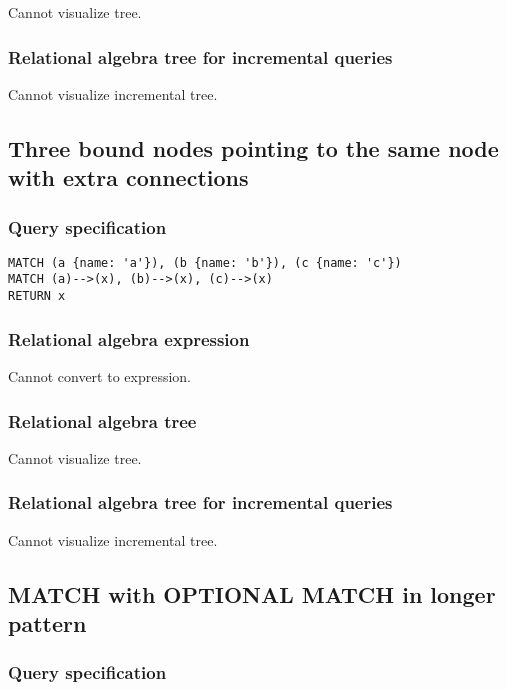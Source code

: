 Cannot visualize tree.

\subsubsection*{Relational algebra tree for incremental queries}

Cannot visualize incremental tree.

\subsection{Three bound nodes pointing to the same node with extra connections}

\subsubsection*{Query specification}

\begin{lstlisting}
MATCH (a {name: 'a'}), (b {name: 'b'}), (c {name: 'c'})
MATCH (a)-->(x), (b)-->(x), (c)-->(x)
RETURN x
\end{lstlisting}

\subsubsection*{Relational algebra expression}

Cannot convert to expression.

\subsubsection*{Relational algebra tree}

Cannot visualize tree.

\subsubsection*{Relational algebra tree for incremental queries}

Cannot visualize incremental tree.

\subsection{MATCH with OPTIONAL MATCH in longer pattern}

\subsubsection*{Query specification}

